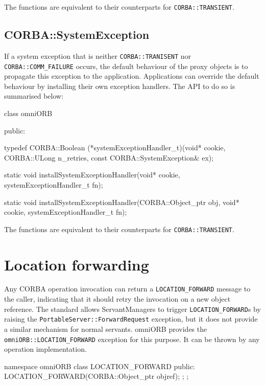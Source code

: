 \documentclass[11pt,twoside,a4paper]{book}
\newcommand{\code}[1]{\texttt{#1}}
\newcommand{\dsc}{\discretionary{}{}{}}
\begin{document}
The functions are equivalent to their counterparts for
\code{CORBA::TRANSIENT}.


\subsection{CORBA::SystemException}

If a system exception that is neither \code{CORBA::TRANISENT} nor
\code{CORBA::COMM\_FAILURE} occurs, the default behaviour of the proxy
objects is to propagate this exception to the application.
Applications can override the default behaviour by installing their
own exception handlers. The API to do so is summarised below:


\begin{cxxlisting}
class omniORB {
public:

typedef CORBA::Boolean (*systemExceptionHandler_t)(void* cookie,
                                            CORBA::ULong n_retries,
                                            const CORBA::SystemException& ex);

static void installSystemExceptionHandler(void* cookie,
                                          systemExceptionHandler_t fn);

static void installSystemExceptionHandler(CORBA::Object_ptr obj,
                                          void* cookie,
                                          systemExceptionHandler_t fn);
}
\end{cxxlisting}

The functions are equivalent to their counterparts for
\code{CORBA::TRANSIENT}.



\section{Location forwarding}
\label{sec:locationForward}

Any CORBA operation invocation can return a \code{LOCATION\_FORWARD}
message to the caller, indicating that it should retry the invocation
on a new object reference. The standard allows ServantManagers to
trigger \code{LOCATION\_FORWARD}s by raising the
\code{PortableServer::ForwardRequest} exception, but it does not
provide a similar mechanism for normal servants. omniORB provides the
\code{omniORB::\dsc{}LOCATION\_FORWARD} exception for this purpose. It
can be thrown by any operation implementation.

\begin{cxxlisting}
namespace omniORB {
  class LOCATION_FORWARD {
  public:
    LOCATION_FORWARD(CORBA::Object_ptr objref);
  };
};
\end{cxxlisting}
\end{document}
